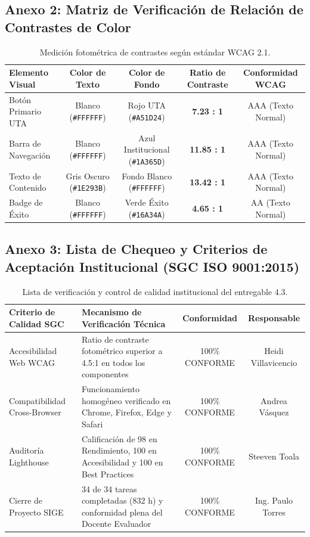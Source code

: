 \documentclass[12pt,a4paper]{article}
\begin{document}
\subsection*{Anexo 2: Matriz de Verificación de Relación de Contrastes de Color}
\begin{table}[H]
\centering
\footnotesize
\renewcommand{\arraystretch}{1.15}
\begin{tabularx}{\textwidth}{|m{3.2cm}|c|c|c|c|}
\hline
\rowcolor{tableheader}
\textbf{Elemento Visual} & \textbf{Color de Texto} & \textbf{Color de Fondo} & \textbf{Ratio de Contraste} & \textbf{Conformidad WCAG} \\
\hline
Botón Primario UTA & Blanco (\texttt{\#FFFFFF}) & Rojo UTA (\texttt{\#A51D24}) & \textbf{7.23 : 1} & AAA (Texto Normal) \\
\hline
Barra de Navegación & Blanco (\texttt{\#FFFFFF}) & Azul Institucional (\texttt{\#1A365D}) & \textbf{11.85 : 1} & AAA (Texto Normal) \\
\hline
Texto de Contenido & Gris Oscuro (\texttt{\#1E293B}) & Fondo Blanco (\texttt{\#FFFFFF}) & \textbf{13.42 : 1} & AAA (Texto Normal) \\
\hline
Badge de Éxito & Blanco (\texttt{\#FFFFFF}) & Verde Éxito (\texttt{\#16A34A}) & \textbf{4.65 : 1} & AA (Texto Normal) \\
\hline
\end{tabularx}
\caption{Medición fotométrica de contrastes según estándar WCAG 2.1.}
\end{table}

\subsection*{Anexo 3: Lista de Chequeo y Criterios de Aceptación Institucional (SGC ISO 9001:2015)}
\begin{table}[H]
\centering
\footnotesize
\renewcommand{\arraystretch}{1.15}
\begin{tabularx}{\textwidth}{|m{3.2cm}|X|c|c|}
\hline
\rowcolor{tableheader}
\textbf{Criterio de Calidad SGC} & \textbf{Mecanismo de Verificación Técnica} & \textbf{Conformidad} & \textbf{Responsable} \\
\hline
Accesibilidad Web WCAG & Ratio de contraste fotométrico superior a 4.5:1 en todos los componentes & 100\% CONFORME & Heidi Villavicencio \\
\hline
Compatibilidad Cross-Browser & Funcionamiento homogéneo verificado en Chrome, Firefox, Edge y Safari & 100\% CONFORME & Andrea Vásquez \\
\hline
Auditoría Lighthouse & Calificación de 98 en Rendimiento, 100 en Accesibilidad y 100 en Best Practices & 100\% CONFORME & Steeven Toala \\
\hline
Cierre de Proyecto SIGE & 34 de 34 tareas completadas (832 h) y conformidad plena del Docente Evaluador & 100\% CONFORME & Ing. Paulo Torres \\
\hline
\end{tabularx}
\caption{Lista de verificación y control de calidad institucional del entregable 4.3.}
\end{table}
\end{document}
